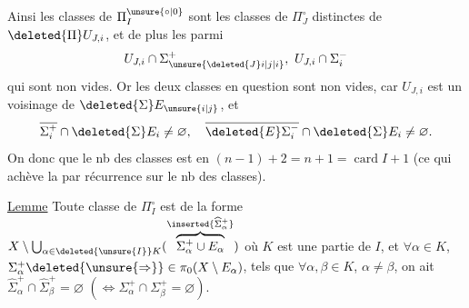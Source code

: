 Ainsi les classes de $\Pi_I^{\unsure{\circ|0}}$ sont les classes de $\Pi_J^\circ$ distinctes de $\deleted{\Pi}U_{J,i}$, et de plus les  parmi
\[
U_{J,i}\cap\Sigma_{\unsure{\deleted{J}i|j|i}}^+,\ U_{J,i}\cap\Sigma_i^-
\]
qui sont non vides. Or les deux classes en question sont non vides, car  $U_{J,i}$ est un voisinage de $\deleted{\Sigma}E_{\unsure{i|j}}$, et
\[
\overline{\Sigma_i^+}\cap\deleted{\Sigma}E_i\ne\varnothing,\quad
\overline{\deleted{E}\Sigma_i^-}\cap\deleted{\Sigma}E_i\ne\varnothing.
\]
On  donc que le nb des classes est en  $(n-1)+2=n+1=\operatorname{card} I+1$ (ce qui achève  la  par récurrence sur le nb des classes).

\uline{Lemme} Toute classe de $\Pi_I^\circ$ est de la forme $X\setminus\bigcup_{\alpha\in\deleted{\unsure{I}}K}(\overbrace{\Sigma_\alpha^+\cup E_\alpha}^{\inserted{\widehat{\Sigma}_\alpha^+}})$ où $K$ est une partie  de $I$, et
\reversemarginpar{}\normalmarginpar
$\forall\alpha\in K$,  $\Sigma_\alpha^+\deleted{\unsure{\Rightarrow}}\in\pi_0(X\setminus E_\alpha)$, tels que $\forall\alpha,\beta\in K$, $\alpha\ne\beta$, on ait $\widehat{\Sigma}_\alpha^+\cap\widehat{\Sigma}_\beta^+=\varnothing$ $(\Longleftrightarrow\Sigma_\alpha^+\cap\Sigma_\beta^+=\varnothing)$.
